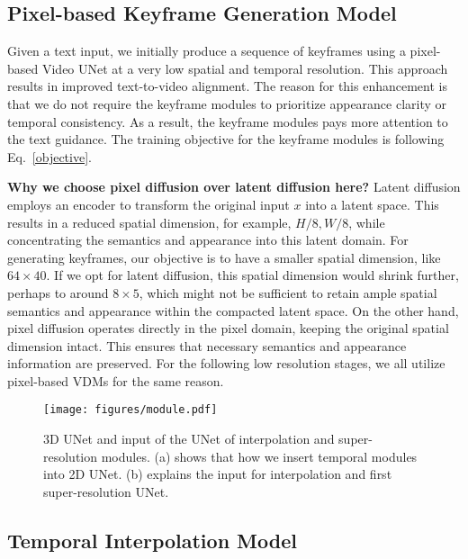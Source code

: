 \documentclass{article} \usepackage{iclr2024_conference,times}
\begin{document}
\subsection{Pixel-based Keyframe Generation Model} Given a text input, we initially produce a sequence of keyframes using a pixel-based Video UNet at a very low spatial and temporal resolution. This approach results in improved text-to-video alignment. The reason for this enhancement is that we do not require the keyframe modules to prioritize appearance clarity or temporal consistency. As a result, the keyframe modules pays more attention to the text guidance. The training objective for the keyframe modules is following Eq.~\ref{objective}.  

\noindent\textbf{Why we choose pixel diffusion over latent diffusion here?}
Latent diffusion employs an encoder to transform the original input $x$ into a latent space. This results in a reduced spatial dimension, for example, $H/8, W/8$, while concentrating the semantics and appearance into this latent domain. For generating keyframes, our objective is to have a smaller spatial dimension, like $64 \times 40$. If we opt for latent diffusion, this spatial dimension would shrink further, perhaps to around $ 8 \times 5$, which might not be sufficient to retain ample spatial semantics and appearance within the compacted latent space. On the other hand, pixel diffusion operates directly in the pixel domain, keeping the original spatial dimension intact. This ensures that  necessary semantics and appearance information are preserved. For the following low resolution stages, we all utilize pixel-based VDMs for the same reason.
\begin{figure}[t]
    \centering
    \texttt{[image: figures/module.pdf]}
    \caption{3D UNet and input of the UNet of interpolation and super-resolution modules. (a) shows that how we insert temporal modules into 2D UNet. (b) explains the input for interpolation and first super-resolution UNet.}
    \label{fig:block}
\end{figure}

\subsection{Temporal Interpolation Model}
\end{document}
